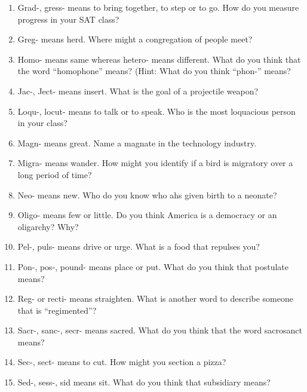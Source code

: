 \begin{enumerate}
\item Grad-, gress- means to bring together, to step or to go. How do you measure progress in your SAT class? \hrulefill

\item Greg- means herd. Where might a congregation of people meet? \hrulefill

\item Homo- means same whereas hetero- means different. What do you think that the word ``homophone'' means? \hrulefill (Hint: What do you think ``phon-'' means? \hrulefill

\item Jac-, Ject- means insert. What is the goal of a projectile weapon? \hrulefill

\item Loqu-, locut- means to talk or to speak. Who is the most loquacious person in your class? \hrulefill

\item Magn- means great. Name a magnate in the technology industry. \hrulefill

\item Migra- means wander. How might you identify if a bird is migratory over a long period of time? \hrulefill

\item Neo- means new. Who do you know who ahs given birth to a neonate? \hrulefill

\item Oligo- means few or little. Do you think America is a democracy or an oligarchy? Why? \hrulefill

\item Pel-, puls- means drive or urge. What is a food that repulses you? \hrulefill

\item  Pon-, pos-, pound- means place or put. What do you think that postulate means? \hrulefill

\item Reg- or recti- means straighten. What is another word to describe someone that is ``regimented''? \hrulefill

\item Sacr-, sanc-, secr- means sacred. What do you think that the word sacrosanct means? \hrulefill

 \item  Sec-, sect- means to cut. How might you section a pizza? \hrulefill

 \item Sed-, sess-, sid means sit. What do you think that subsidiary means? \hrulefill
 
 \end{enumerate}